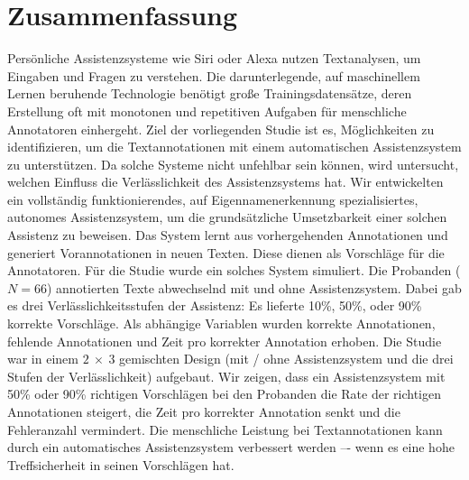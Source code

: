 \section*{Zusammenfassung}
	Persönliche Assistenzsysteme wie Siri oder Alexa nutzen Textanalysen, um Eingaben und Fragen zu verstehen. Die darunterlegende, auf maschinellem Lernen beruhende Technologie benötigt große Trainingsdatensätze, deren Erstellung oft mit monotonen und repetitiven Aufgaben für menschliche Annotatoren einhergeht. Ziel der vorliegenden Studie ist es, Möglichkeiten zu identifizieren, um die Textannotationen mit einem automatischen Assistenzsystem zu unterstützen. Da solche Systeme nicht unfehlbar sein können, wird untersucht, welchen Einfluss die Verlässlichkeit des Assistenzsystems hat. Wir entwickelten ein vollständig funktionierendes, auf Eigennamenerkennung spezialisiertes, autonomes Assistenzsystem, um die grundsätzliche Umsetzbarkeit einer solchen Assistenz zu beweisen. Das System lernt aus vorhergehenden Annotationen und generiert Vorannotationen in neuen Texten. Diese dienen als Vorschläge für die Annotatoren. Für die Studie wurde ein solches System simuliert. Die Probanden ($N = 66$) annotierten Texte abwechselnd mit und ohne Assistenzsystem. Dabei gab es drei Verlässlichkeitsstufen der Assistenz: Es lieferte 10\%, 50\%, oder 90\% korrekte Vorschläge. Als abhängige Variablen wurden korrekte Annotationen, fehlende Annotationen und Zeit pro korrekter Annotation erhoben. Die Studie war in einem $2\ \times\ 3$ gemischten Design (mit / ohne Assistenzsystem und die drei Stufen der Verlässlichkeit) aufgebaut. Wir zeigen, dass ein Assistenzsystem mit 50\% oder 90\% richtigen Vorschlägen bei den Probanden die Rate der richtigen Annotationen steigert, die Zeit pro korrekter Annotation senkt und die Fehleranzahl vermindert. Die menschliche Leistung bei Textannotationen kann durch ein automatisches Assistenzsystem verbessert werden –- wenn es eine hohe Treffsicherheit in seinen Vorschlägen hat.
